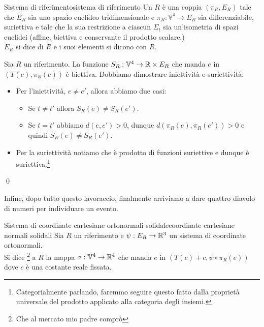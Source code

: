 \documentclass[annatarbolditalic, openany]{book}
\renewcommand\V{\mathbb{V}}
\begin{document}
\begin{definition}{Sistema di riferimento}{sistema di riferimento}
    Un  $R$ è una coppia $(\pi_R, E_R)$ tale che $E_R$ sia uno spazio euclideo tridimensionale e $\pi_R : \V^4 \to E_R$ sia differenziabile, suriettiva e tale che la sua restrizione a ciascun $\Sigma_t$ sia un'isometria di spazi euclidei (affine, biettiva e conservante il prodotto scalare.)\\
    $E_R$ si dice  di $R$ e i suoi elementi si dicono  con $R$.
\end{definition}

\begin{proposition}{}{}
    Sia $R$ un riferimento. La funzione $S_R : \V^4 \to \R \times E_R$ che manda $e$ in $(T(e), \pi_R(e))$ è biettiva.
    \proof 
    Dobbiamo dimostrare iniettività e suriettività:\begin{itemize}
        \item Per l'iniettività, $e \neq e'$, allora abbiamo due casi:\begin{itemize}
                \item Se $t \neq t'$ allora $S_R(e) \neq S_R(e')$.
                \item Se $t=t'$ abbiamo $d(e,e') > 0$, dunque $d(\pi_R(e), \pi_R(e'))>0$ e quindi $S_R(e) \neq S_R(e')$.
            \end{itemize}
        \item Per la suriettività notiamo che è prodotto di funzioni suriettive e dunque è suriettiva.\footnote{Categorialmente parlando, faremmo seguire questo fatto dalla proprietà universale del prodotto applicato alla categoria degli insiemi.}
    \end{itemize}
    \qed
\end{proposition}

Infine, dopo tutto questo lavoraccio, finalmente arriviamo a dare quattro diavolo di numeri per individuare un evento.

\begin{definition}{Sistema di coordinate cartesiane ortonormali solidale}{coordinate cartesiane normali solidali}
    Sia $R$ un riferimento e $\psi : E_R \to \mathbb{R}^3$ un sistema di coordinate ortonormali.\\
    Si dice \footnote{Che al mercato mio padre comprò} a $R$ la mappa $\sigma : \V^4 \to \R^4$ che manda $e$ in $(T(e)+c, \psi\circ \pi_R(e))$ dove $c$ è una costante reale fissata.
\end{definition}
\end{document}
